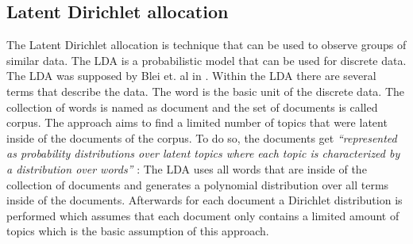 \subsection{Latent Dirichlet allocation} %
\label{sub:lda}

The Latent Dirichlet allocation is technique that can be used to observe groups of similar data. The LDA is a probabilistic model that can be used for discrete data. The LDA was supposed by Blei et. al in \cite{blei_latent_nodate}.
Within the LDA there are several terms that describe the data. The word is the basic unit of the discrete data. The collection of words is named as document and the set of documents is called corpus.
The approach aims to find a limited number of topics that were latent inside of the documents of the corpus. To do so, the documents get \textit{``represented as probability distributions over latent topics where each topic is characterized  by a distribution over words''} \cite{niu_topic2vec_2015}:
The LDA uses all words that are inside of the collection of documents and generates a polynomial distribution over all terms inside of the documents. Afterwards for each document a Dirichlet distribution is performed which assumes that each document only contains a limited amount of topics which is the basic assumption of this approach.
